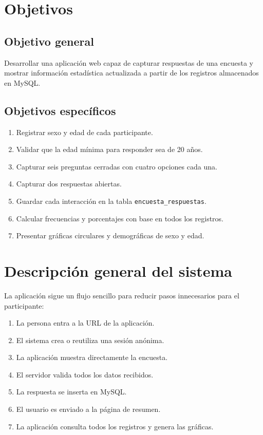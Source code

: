 \documentclass[12pt,letterpaper,oneside]{extreport}
\begin{document}
\chapter{Objetivos}

\section{Objetivo general}

Desarrollar una aplicación web capaz de capturar respuestas de una encuesta y mostrar información estadística actualizada a partir de los registros almacenados en MySQL.

\section{Objetivos específicos}

\begin{enumerate}[label=\arabic*.]
    \item Registrar sexo y edad de cada participante.
    \item Validar que la edad mínima para responder sea de 20 años.
    \item Capturar seis preguntas cerradas con cuatro opciones cada una.
    \item Capturar dos respuestas abiertas.
    \item Guardar cada interacción en la tabla \texttt{encuesta\_respuestas}.
    \item Calcular frecuencias y porcentajes con base en todos los registros.
    \item Presentar gráficas circulares y demográficas de sexo y edad.
\end{enumerate}

\chapter{Descripción general del sistema}

La aplicación sigue un flujo sencillo para reducir pasos innecesarios para el participante:

\begin{enumerate}[label=\arabic*.]
    \item La persona entra a la URL de la aplicación.
    \item El sistema crea o reutiliza una sesión anónima.
    \item La aplicación muestra directamente la encuesta.
    \item El servidor valida todos los datos recibidos.
    \item La respuesta se inserta en MySQL.
    \item El usuario es enviado a la página de resumen.
    \item La aplicación consulta todos los registros y genera las gráficas.
\end{enumerate}
\end{document}
